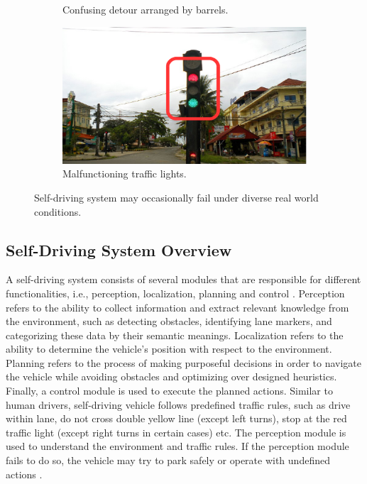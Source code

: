 \begin{figure}[ht]
\begin{subfigure}[t]{0.33\textwidth}
    \vspace{-0.2cm}
    \caption{Confusing detour arranged by barrels.}
    \label{motivation:detour}
  \end{subfigure}%
  \begin{subfigure}[t]{0.33\textwidth}
    \includegraphics[width=\linewidth]{Figs/RTDrive/motivation/malfunctioning_traffic_light.jpg}
    \vspace{-0.2cm}
    \caption{Malfunctioning traffic lights.}
    \label{motivation:malfunction}
  \end{subfigure}%
  \vspace{-0.3cm}
  \caption{Self-driving system may occasionally fail under diverse real world conditions.}
  \label{motivation}
  \vspace{0.0cm}
\centering
\end{figure}


\subsection{Self-Driving System Overview}


A self-driving system consists of several modules that are responsible for
different functionalities, i.e.,  
perception, localization, planning and control \cite{pendleton2017perception}. 
Perception refers to the ability to collect information and extract
relevant knowledge from the environment, 
such as detecting obstacles, identifying lane markers,
and categorizing these data by their semantic meanings. 
Localization refers to the ability to determine the 
vehicle's position with respect to the environment. 
Planning refers to the process of making purposeful decisions 
in order to navigate the vehicle 
while avoiding obstacles and optimizing over designed heuristics.
Finally, a control module is used to execute the planned actions.
Similar to human drivers, self-driving vehicle follows predefined traffic rules, 
such as drive within lane, do not cross double yellow line (except left turns),
stop at the red traffic light (except right turns in certain cases) etc. 
The perception module is used to understand the environment 
and traffic rules. 
If the perception module fails to do so, the vehicle may try to park
safely or operate with undefined actions \cite{waymo}.  

